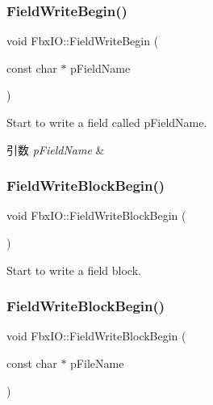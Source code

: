 \subsubsection{\texorpdfstring{Field\+Write\+Begin()}{FieldWriteBegin()}}
{\footnotesize\ttfamily void Fbx\+I\+O\+::\+Field\+Write\+Begin (\begin{DoxyParamCaption}\item[{const char $\ast$}]{p\+Field\+Name }\end{DoxyParamCaption})}

Start to write a field called p\+Field\+Name. 
\begin{DoxyParams}{引数}
{\em p\+Field\+Name} & \\
\hline
\end{DoxyParams}
\mbox{\label{class_fbx_i_o_a2e07ae609e53d26a88f13b4b04c1858c}} 
\subsubsection{\texorpdfstring{Field\+Write\+Block\+Begin()}{FieldWriteBlockBegin()}\hspace{0.1cm}{\footnotesize\ttfamily [1/2]}}
{\footnotesize\ttfamily void Fbx\+I\+O\+::\+Field\+Write\+Block\+Begin (\begin{DoxyParamCaption}{ }\end{DoxyParamCaption})}



Start to write a field block. 

\mbox{\label{class_fbx_i_o_a37c1bbfe8ebf2bffb7f35fd01b7595af}} 
\subsubsection{\texorpdfstring{Field\+Write\+Block\+Begin()}{FieldWriteBlockBegin()}\hspace{0.1cm}{\footnotesize\ttfamily [2/2]}}
{\footnotesize\ttfamily void Fbx\+I\+O\+::\+Field\+Write\+Block\+Begin (\begin{DoxyParamCaption}\item[{const char $\ast$}]{p\+File\+Name }\end{DoxyParamCaption})}


